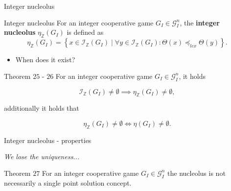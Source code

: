 \documentclass{beamer}
\newcommand{\Z}{\mathbb{Z}}
\begin{document}
\begin{frame}{Integer nucleolus}

    \begin{block}{Integer nucleolus}
        For an integer cooperative game $G_I \in \mathcal{G}_I^n$, the \textbf{integer nucleolus} $\eta_\Z(G_I)$ is defined as
        \begin{displaymath}
            \eta_{\Z}(G_I) = \left\{ x \in \mathcal{I}_\Z(G_I) \mid \forall y \in \mathcal{I}_\Z(G_I): \Theta(x) \preceq_{lex} \Theta(y)\right\}.
        \end{displaymath}
    \end{block}


    \begin{itemize}
        \item When does it exist?
    \end{itemize}


    \begin{block}{Theorem $25$ - $26$}
        For an integer cooperative game $G_I \in \mathcal{G}_I^n$, it holds

        \begin{displaymath}
            \mathcal{I}_{\Z}(G_I) \neq \emptyset \implies \eta_\Z(G_I) \neq \emptyset,
        \end{displaymath}

        additionally it holds that

        \begin{displaymath}
            \eta_\Z(G_I) \neq \emptyset \iff \eta(G_I) \neq \emptyset.
        \end{displaymath}
    \end{block}
\end{frame}



\begin{frame}{Integer nucleolus - properties}

    \textit{We lose the uniqueness...}

    \begin{block}{Theorem $27$}
        For an integer cooperative game $G_I \in \mathcal{G}_I^n$ the nucleolus is not necessarily a single point solution concept.
    \end{block}
\end{frame}
\end{document}
